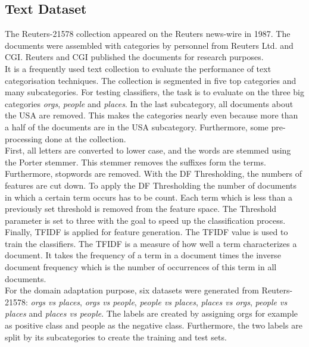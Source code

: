 \subsection{Text Dataset}\label{EmSubSecText}
The Reuters-21578 collection appeared on the Reuters news-wire in 1987.
The documents were assembled with categories by personnel from Reuters Ltd. and \ac{CGI}.
Reuters and \acs{CGI} published the documents for research purposes.\cite{DavidD.Lewis.2004}\\
It is a frequently used text collection to evaluate the performance of text categorisation techniques.
The collection is segmented in five top categories and many subcategories.
For testing classifiers, the task is to evaluate on the three big categories \textit{orgs}, \textit{people} and \textit{places}. 
In the last subcategory, all documents about the USA are removed.
This makes the categories nearly even because more than a half of the documents are in the USA subcategory. 
Furthermore, some pre-processing done at the collection.\cite{WenyuanDai.2007}\\
First, all letters are converted to lower case, and the words are stemmed using the Porter stemmer.
This stemmer removes the suffixes form the terms.\cite{Porter.1997} 
Furthermore, stopwords are removed. With the \ac{DF} Thresholding, the numbers of features are cut down.
To apply the \acs{DF} Thresholding the number of documents in which a certain term occurs has to be count.
Each term which is less than a previously set threshold is removed from the feature space.\cite{Yang.1997}
The Threshold parameter is set to three with the goal to speed up the classification process.
Finally, \ac{TFIDF} is applied for feature generation.
The \acs{TFIDF} value is used to train the classifiers.
The \acs{TFIDF} is a measure of how well a term characterizes a document.
It takes the frequency of a term in a document times the inverse document frequency which is the number of occurrences of this term in all documents. \cite[p. 26]{Leskovec.2014}\\
For the domain adaptation purpose, six datasets were generated from Reuters-21578:
\textit{orgs vs places}, \textit{orgs vs people}, \textit{people vs places}, \textit{places vs orgs}, \textit{people vs places} and \textit{places vs people}.
The labels are created by assigning orgs for example as positive class and people as the negative class.
Furthermore, the two labels are split by its subcategories to create the training and test sets.\cite{WenyuanDai.2007}\\
